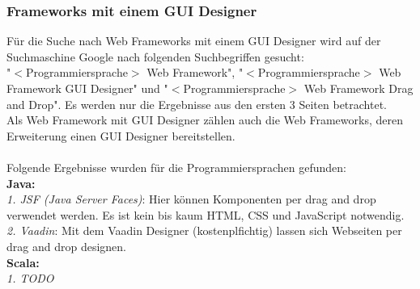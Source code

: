 \documentclass[ngerman]{article}
\begin{document}
    \subsubsection{Frameworks mit einem GUI Designer}
    \label{GrundlagenWebFrameworksWithGUIDesigner}
    Für die Suche nach Web Frameworks mit einem GUI Designer wird auf der Suchmaschine Google nach folgenden Suchbegriffen gesucht:\\
    "$<$Programmiersprache$>$ Web Framework", "$<$Programmiersprache$>$ Web Framework GUI Designer" und "$<$Programmiersprache$>$ Web Framework Drag and Drop". Es werden nur die Ergebnisse aus den ersten 3 Seiten betrachtet.\\
    Als Web Framework mit GUI Designer zählen auch die Web Frameworks, deren Erweiterung einen GUI Designer bereitstellen.\\\\
    Folgende Ergebnisse wurden für die Programmiersprachen gefunden:\\
    \textbf{Java:}\\
    \textit{1. JSF (Java Server Faces)}: Hier können Komponenten per drag and drop verwendet werden. Es ist kein bis kaum HTML, CSS und JavaScript notwendig. \cite{JavaWebFramework1}\\
    \textit{2. Vaadin}: Mit dem Vaadin Designer (kostenplfichtig) lassen sich Webseiten per drag and drop designen. \cite{JavaVaadinDesigner}\\
    \textbf{Scala:}\\
    \textit{1. TODO}
    \newpage\noindent
\end{document}
